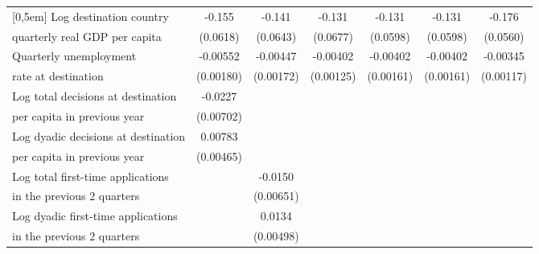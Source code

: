 \begin{table}[!ht]
\begin{tabular}{l*{6}{c}}
[0,5em]
Log destination country&      -0.155\sym{*}  &      -0.141\sym{*}  &      -0.131         &      -0.131\sym{*}  &      -0.131\sym{*}  &      -0.176\sym{**} \\
 quarterly real GDP per capita                    &    (0.0618)         &    (0.0643)         &    (0.0677)         &    (0.0598)         &    (0.0598)         &    (0.0560)         \\
[0,5em]
Quarterly unemployment &    -0.00552\sym{**} &    -0.00447\sym{*}  &    -0.00402\sym{**} &    -0.00402\sym{*}  &    -0.00402\sym{*}  &    -0.00345\sym{**} \\
rate at destination                    &   (0.00180)         &   (0.00172)         &   (0.00125)         &   (0.00161)         &   (0.00161)         &   (0.00117)         \\
[0,5em]
Log total decisions at destination &     -0.0227\sym{**} &                     &                     &                     &                     &                     \\
per capita in previous year                    &   (0.00702)         &                     &                     &                     &                     &                     \\
[0,5em]
Log dyadic decisions at destination&     0.00783         &                     &                     &                     &                     &                     \\
 per capita in previous year                    &   (0.00465)         &                     &                     &                     &                     &                     \\
[0,5em]
Log total first-time applications&                     &     -0.0150\sym{*}  &                     &                     &                     &                     \\
 in the previous 2 quarters                    &                     &   (0.00651)         &                     &                     &                     &                     \\
[0,5em]
Log dyadic first-time applications &                     &      0.0134\sym{**} &                     &                     &                     &                     \\
in the previous 2 quarters                    &                     &   (0.00498)         &                     &                     &                     &                     \\

\end{tabular}
\end{table}
